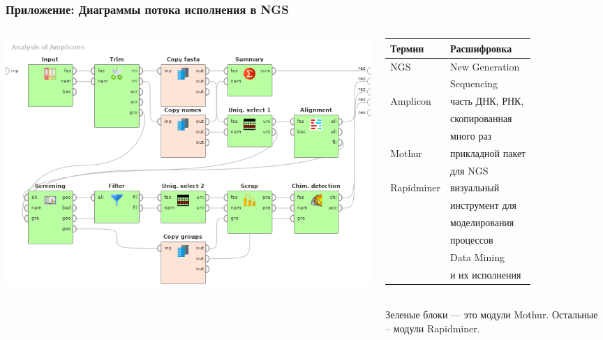 \documentclass[10pt]{beamer}
\begin{document}
\begin{frame}[fragile]
  \frametitle{Приложение: Диаграммы потока исполнения в NGS}
  \begin{columns}
    \begin{column}{0.6\textwidth}
      \begin{raggedright}
        \includegraphics[width=1\linewidth]{Dataflow-color-en.png}
      \end{raggedright}
    \end{column}
    \begin{column}{0.4\textwidth}\footnotesize
      \begin{tabular}{ll}
        Термин & Расшифровка \\
        \hline
        NGS & New Generation \\
               & Sequencing \\
        Amplicon & часть ДНК, РНК, \\
               & скопированная \\
               & много раз \\
        Mothur & прикладной пакет \\
               & для NGS \\
        Rapidminer & визуальный \\
               & инструмент для \\
               & моделирования \\
               & процессов \\
               & Data Mining\\
               & и их исполнения
      \end{tabular}
      ${}$\\[1em]
      Зеленые блоки — это модули Mothur. Остальные -- модули Rapidminer.
    \end{column}
  \end{columns}
\end{frame}
\end{document}
